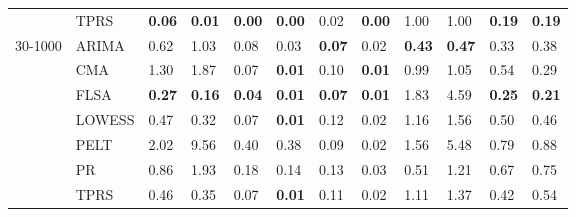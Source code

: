 \begin{table}[ht]
\begin{tabular}{llllllllllll}
   & TPRS & \textbf{0.06} & \textbf{0.01} & \textbf{0.00} & \textbf{0.00} & 0.02 & \textbf{0.00} & 1.00 & 1.00 & \textbf{0.19} & \textbf{0.19} \\ 
  30-1000 & ARIMA & 0.62 & 1.03 & 0.08 & 0.03 & \textbf{0.07} & 0.02 & \textbf{0.43} & \textbf{0.47} & 0.33 & 0.38 \\ 
   & CMA & 1.30 & 1.87 & 0.07 & \textbf{0.01} & 0.10 & \textbf{0.01} & 0.99 & 1.05 & 0.54 & 0.29 \\ 
   & FLSA & \textbf{0.27} & \textbf{0.16} & \textbf{0.04} & \textbf{0.01} & \textbf{0.07} & \textbf{0.01} & 1.83 & 4.59 & \textbf{0.25} & \textbf{0.21} \\ 
   & LOWESS & 0.47 & 0.32 & 0.07 & \textbf{0.01} & 0.12 & 0.02 & 1.16 & 1.56 & 0.50 & 0.46 \\ 
   & PELT & 2.02 & 9.56 & 0.40 & 0.38 & 0.09 & 0.02 & 1.56 & 5.48 & 0.79 & 0.88 \\ 
   & PR & 0.86 & 1.93 & 0.18 & 0.14 & 0.13 & 0.03 & 0.51 & 1.21 & 0.67 & 0.75 \\ 
   & TPRS & 0.46 & 0.35 & 0.07 & \textbf{0.01} & 0.11 & 0.02 & 1.11 & 1.37 & 0.42 & 0.54 \\ 
   \bottomrule
\end{tabular}
\end{table}
